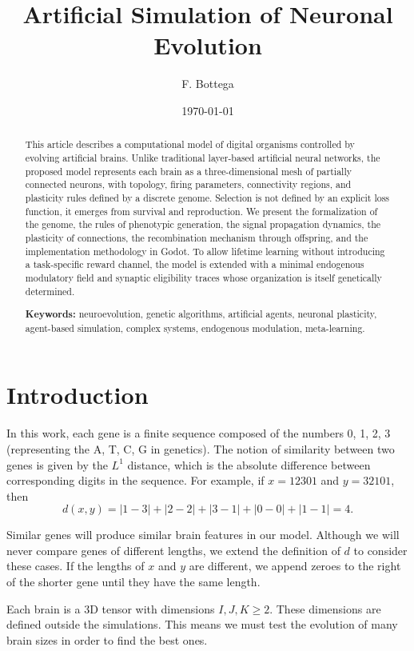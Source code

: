 \documentclass[12pt,a4paper]{article}
\title{\textbf{Artificial Simulation of Neuronal Evolution}}
\author{F. Bottega}
\date{\today}
\begin{document}
\maketitle

\begin{abstract}
\noindent This article describes a computational model of digital organisms controlled by evolving artificial brains. Unlike traditional layer-based artificial neural networks, the proposed model represents each brain as a three-dimensional mesh of partially connected neurons, with topology, firing parameters, connectivity regions, and plasticity rules defined by a discrete genome. Selection is not defined by an explicit loss function, it emerges from survival and reproduction. We present the formalization of the genome, the rules of phenotypic generation, the signal propagation dynamics, the plasticity of connections, the recombination mechanism through offspring, and the implementation methodology in Godot. To allow lifetime learning without introducing a task-specific reward channel, the model is extended with a minimal endogenous modulatory field and synaptic eligibility traces whose organization is itself genetically determined.

\medskip
\noindent \textbf{Keywords:} neuroevolution, genetic algorithms, artificial agents, neuronal plasticity, agent-based simulation, complex systems, endogenous modulation, meta-learning.
\end{abstract}

\section{Introduction}

	In this work, each gene is a finite sequence composed of the numbers 0, 1, 2, 3 (representing the A, T, C, G in genetics). The notion of similarity between two genes is given by the $L^1$ distance, which is the absolute difference between corresponding digits in the sequence. For example, if $x = 12301$ and $y = 32101$, then 
	$$d(x, y) = |1-3| + |2-2| + |3-1| + |0-0| + |1-1| = 4.$$ 
	
	Similar genes will produce similar brain features in our model. Although we will never compare genes of different lengths, we extend the definition of $d$ to consider these cases. If the lengths of $x$ and $y$ are different, we append zeroes to the right of the shorter gene until they have the same length.
	
	Each brain is a 3D tensor with dimensions $I, J, K \geq 2$. These dimensions are defined outside the simulations. This means we must test the evolution of many brain sizes in order to find the best ones. 
	
\end{document}
